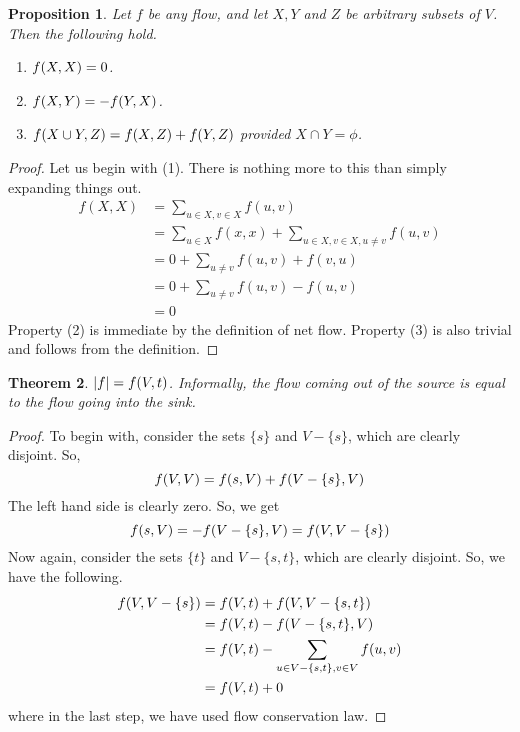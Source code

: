 \documentclass[12pt,a4paper]{amsart}
\numberwithin{equation}{section}
\newtheorem{Th}{Theorem}[section]
\newtheorem{Prop}[Th]{Proposition}
\theoremstyle{definition}
\begin{document}
\begin{Prop}
	Let $f$ be any flow, and let $X, Y$ and $Z$ be arbitrary subsets of $V$. Then the following hold. 
	\begin{enumerate}
		\item $f(X, X) = 0$.
		\item $f(X, Y) = -f(Y, X)$.
		\item $f(X\cup Y, Z) = f(X, Z) + f(Y, Z)$ provided $X\cap Y = \phi$. 
	\end{enumerate}
\end{Prop}
\begin{proof}
	Let us begin with (1). There is nothing more to this than simply expanding things out. 
	\begin{align*}
		f(X, X) &= \sum_{u\in X, v\in X}f(u, v)\\
		&= \sum_{u\in X}f(x, x) + \sum_{u\in X, v\in X, u \ne v}f(u , v)\\
		&= 0 + \sum_{u\ne v} f(u, v) + f(v , u)\\
		&= 0 + \sum_{u\ne v} f(u, v) - f(u , v)\\
		&= 0
	\end{align*}
	Property (2) is immediate by the definition of net flow. Property (3) is also trivial and follows from the definition.
\end{proof}

\begin{Th}
	$|f| = f(V, t)$. Informally, the flow coming out of the source is equal to the flow going into the sink.
\end{Th}
\begin{proof}
	To begin with, consider the sets $\{s\}$ and $V - \{s\}$, which are clearly disjoint. So, 
	$$f(V, V) = f(s, V) + f(V - \{s\}, V)$$
	The left hand side is clearly zero. So, we get 
	$$f(s, V) = -f(V - \{s\}, V) = f(V, V - \{s\})$$
	Now again, consider the sets $\{t\}$ and $V - \{s,t\}$, which are clearly disjoint. So, we have the following. 
	\begin{align*}
		f(V, V - \{s\}) &= f(V, t) + f(V, V - \{s, t\})\\
		&= f(V, t) - f(V - \{s, t\}, V)\\
		&= f(V, t) - \sum_{u\in V - \{s, t\}, v\in V} f(u, v)\\
		&= f(V, t) + 0
	\end{align*}
	where in the last step, we have used flow conservation law. 
\end{proof}
\end{document}
